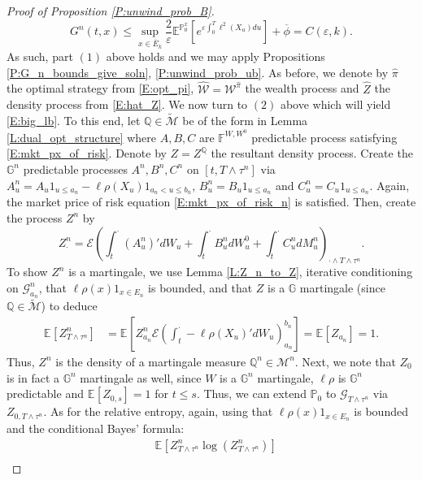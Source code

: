 \documentclass[11pt, letterpaper]{amsart}
\theoremstyle{definition}
\theoremstyle{remark}
\numberwithin{equation}{section}
\newcommand{\eps}{\varepsilon}
\newcommand{\We}{\mathcal{W}}
\newcommand{\hwe}{\hat{\We}}
\newcommand{\hz}{\hat{Z}}
\newcommand{\hpi}{\hat{\pi}}
\newcommand{\prob}{\mathbb{P}}
\newcommand{\qprob}{\mathbb{Q}}
\newcommand{\esp}{\mathbb{E}}
\newcommand{\espalt}[2]{\esp^{#1}\bra{#2}}
\newcommand{\G}{\mathcal{G}}
\newcommand{\M}{\mathcal{M}}
\newcommand{\tM}{\widetilde{\mathcal{M}}}
\newcommand{\filt}{\mathbb{F}}
\newcommand{\filtg}{\mathbb{G}}
\newcommand{\EN}{\mathcal{E}}
\newcommand{\bra}[1]{\left[#1\right]}
\newcommand{\ol}[1]{\overline{#1}}
\begin{document}
\begin{proof}[Proof of Proposition \ref{P:unwind_prob_B}]
\begin{equation*}
G^n(t,x) \leq  \sup_{x\in\ol{E}_k} \frac{2}{\eps} \espalt{\prob^x_{0}}{e^{\eps\int_0^T \ell^2(X_u)du}} + \ol{\phi} = C(\eps,k).
\end{equation*}
As such, part $(1)$ above holds and we may apply Propositions \ref{P:G_n_bounds_give_soln}, \ref{P:unwind_prob_ub}.  As before, we denote by $\hpi$ the optimal strategy from \eqref{E:opt_pi}, $\hwe = \We^{\hpi}$ the wealth process and $\hz$ the density process from \eqref{E:hat_Z}.  We now turn to $(2)$ above which will yield \eqref{E:big_lb}.  To this end, let $\qprob\in\tM$ be of the form in Lemma \ref{L:dual_opt_structure} where $A,B,C$ are $\filt^{W,W^0}$ predictable process satisfying \eqref{E:mkt_px_of_risk}.  Denote by $Z = Z^\qprob$ the resultant density process. Create the $\filtg^n$ predictable processes $A^n,B^n,C^n$ on $[t,T\wedge\tau^n]$ via $A^n_u = A_u1_{u\leq a_n} - \ell\rho(X_u)1_{a_n < u \leq b_n}$, $B^n_u = B_u 1_{u\leq a_n}$ and $C^n_u = C_u1_{u\leq a_n}$. Again, the market price of risk equation \eqref{E:mkt_px_of_risk_n} is satisfied. Then, create the process $Z^n$ by
\begin{equation*}
Z^n_\cdot =\EN\left(\int_t^\cdot (A^n_u)'dW_u + \int_t^\cdot B^n_u dW^0_u + \int_{t}^\cdot C^n_u dM^n_u\right)_{\cdot \wedge T\wedge \tau^n}.
\end{equation*}
To show $Z^n$ is a martingale, we use Lemma \ref{L:Z_n_to_Z}, iterative conditioning on $\G^n_{a_n}$, that $\ell\rho (x)1_{x\in E_n}$ is bounded, and that $Z$ is a $\filtg$ martingale (since $\qprob\in \tM$) to deduce
\begin{equation*}
\begin{split}
\espalt{}{Z^n_{T\wedge\tau^n}} &= \espalt{}{Z^n_{a_n}\EN\left(\int_t^\cdot-\ell\rho(X_u)'dW_u\right)_{a_n}^{b_n}}= \espalt{}{Z_{a_n}} =1.
\end{split}
\end{equation*}
Thus, $Z^n$ is the density of a martingale measure $\qprob^n\in\M^n$.  Next, we note that $Z_0$ is in fact a $\filtg^n$ martingale as well, since $W$ is a $\filtg^n$ martingale, $\ell\rho$ is $\filtg^n$ predictable and $\espalt{}{Z_{0,s}} = 1$ for $t\leq s$.  Thus, we can extend $\prob_0$ to $\G_{T\wedge\tau^n}$ via $Z_{0,T\wedge\tau^n}$. As for the relative entropy, again, using that $\ell\rho(x)1_{x\in E_n}$ is bounded and the conditional Bayes' formula:
\begin{equation}\label{E:Z_n_rel_ent_equality_com}
\begin{split}
&\espalt{}{Z^n_{T\wedge\tau^n}\log\left(Z^n_{T\wedge\tau^n}\right)}\\

\end{split}
\end{equation}
\end{proof}
\end{document}
